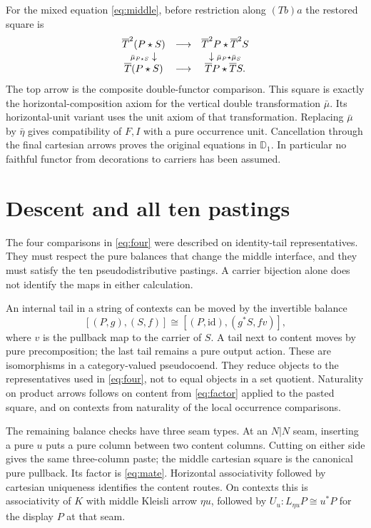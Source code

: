 \documentclass[11pt]{article}
\numberwithin{equation}{section}
\theoremstyle{definition}\newtheorem{definition}[theorem]{Definition}
\newcommand{\D}{\mathbb D}\newcommand{\N}{\mathbb N}
\newcommand{\id}{\mathrm{id}}\newcommand{\op}{\mathrm{op}}\newcommand{\dom}{\mathrm{dom}}\newcommand{\cod}{\mathrm{cod}}
\begin{document}
For the mixed equation \eqref{eq:middle}, before restriction along
$(Tb)a$ the restored square is
\[
 \begin{array}{ccc}
 \overline T^2(P\mathbin{\star} S)&\longrightarrow&\overline T^2P\mathbin{\star}\overline T^2S\\
 {\scriptstyle\bar\mu_{P\mathbin{\star} S}}\downarrow&&
      \downarrow{\scriptstyle\bar\mu_P\mathbin{\star}\bar\mu_S}\\
 \overline T(P\mathbin{\star} S)&\longrightarrow&\overline T P\mathbin{\star}\overline T S.
 \end{array}
\]
The top arrow is the composite double-functor comparison. This square
is exactly the horizontal-composition axiom for the vertical double
transformation $\bar\mu$. Its horizontal-unit variant uses the unit
axiom of that transformation. Replacing $\bar\mu$ by $\bar\eta$
gives compatibility of $F,I$ with a pure occurrence unit. Cancellation
through the final cartesian arrows proves the original equations in
$\D_1$. In particular no faithful functor from decorations to carriers
has been assumed.

\section{Descent and all ten pastings}\label{app:coherence}
The four comparisons in \eqref{eq:four} were described on
identity-tail representatives. They must respect the pure balances
that change the middle interface, and they must satisfy the ten
pseudodistributive pastings. A carrier bijection alone does not
identify the maps in either calculation.

An internal tail in a string of contexts can be moved by the invertible
balance
\[
 [(P,g),(S,f)]\cong[(P,\id),(g^*S,fv)],
\]
where $v$ is the pullback map to the carrier of $S$. A tail next to content
moves by pure precomposition; the last tail remains a pure output action.
These are isomorphisms in a category-valued pseudocoend. They reduce
objects to the representatives used in \eqref{eq:four}, not to equal
objects in a set quotient. Naturality on product arrows follows on
content from \eqref{eq:factor} applied to the pasted square, and on
contexts from naturality of the local occurrence comparisons.

The remaining balance checks have three seam types. At an $N|N$ seam,
inserting a pure $u$ puts a pure column between two content columns.
Cutting on either side gives the same three-column paste; the middle
cartesian square is the canonical pure pullback. Its factor is
\eqref{eq:mate}. Horizontal associativity followed by cartesian uniqueness
identifies the content routes. On contexts this is associativity of $K$
with middle Kleisli arrow $\eta u$, followed by
$U_u:L_{\eta u}P\cong u^*P$ for the display $P$ at that seam.
\end{document}

